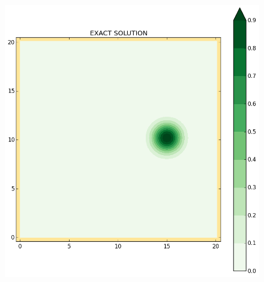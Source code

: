\begin{figure}[h!]
\begin{minipage}[t]{0.50\textwidth}
 \centering
 \includegraphics[trim=19mm 19mm 35mm 21mm,clip,scale=0.28]{../img/figure_EX.png}
\end{minipage}%
\begin{minipage}[t]{0.50\textwidth}
 \centering

\end{minipage}
\end{figure}
